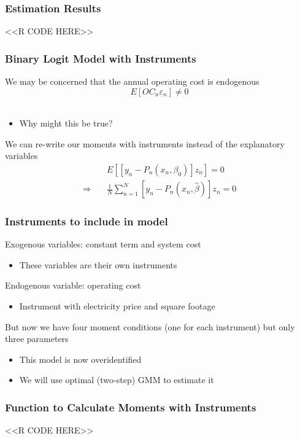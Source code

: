 \documentclass{beamer}
\begin{document}
\begin{frame}[fragile]\frametitle{Estimation Results}
    <<R CODE HERE>>
\end{frame}

\begin{frame}\frametitle{Binary Logit Model with Instruments}
    We may be concerned that the annual operating cost is endogenous
    $$E[OC_n \varepsilon_n] \neq 0$$ \\
    \begin{itemize}
        \item Why might this be true?
    \end{itemize}
    \vspace{3ex}
    We can re-write our moments with instruments instead of the explanatory variables
    \begin{align*}
        &E[[y_n - P_n(x_n, \beta_0)] z_n] = 0 \\
        \Rightarrow \quad &\frac{1}{N} \sum_{n = 1}^N [y_n - P_n(x_n, \hat{\beta})] z_n = 0
    \end{align*}
\end{frame}

\begin{frame}\frametitle{Instruments to include in model}
    Exogenous variables: constant term and system cost
    \begin{itemize}
        \item These variables are their own instruments
    \end{itemize}
    \vspace{2ex}
    Endogenous variable: operating cost
    \begin{itemize}
        \item Instrument with electricity price and square footage
    \end{itemize}
    \vspace{2ex}
    But now we have four moment conditions (one for each instrument) but only three parameters
    \begin{itemize}
        \item This model is now overidentified
        \item We will use optimal (two-step) GMM to estimate it
    \end{itemize}
\end{frame}

\begin{frame}[fragile]\frametitle{Function to Calculate Moments with Instruments}
    <<R CODE HERE>>
\end{frame}
\end{document}
